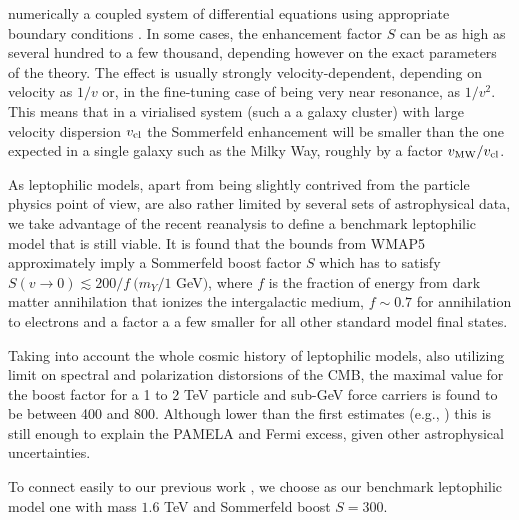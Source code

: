 \documentclass[10pt,aps,pra,reprint,amsmath,amsfonts,amssymb,showpacs]{revtex4-1}
\begin{document}
numerically a coupled system of differential equations using
appropriate boundary conditions
\cite{2005PhRvD..71f3528H,2007NuPhB.787..152C,2009PhRvD..79a5014A}. In
some cases, the enhancement factor $S$ can be as high as several
hundred to a few thousand, depending however on the exact parameters of
the theory. The effect is usually strongly velocity-dependent,
depending on velocity as $1/v$ or, in the fine-tuning case of being
very near resonance, as $1/v^2$. This means that in a virialised
system (such a a galaxy cluster) with large velocity dispersion
$v_{\rm cl}$ the Sommerfeld enhancement will be smaller than the one
expected in a single galaxy such as the Milky Way, roughly by a factor
$v_{\rm MW}/v_{\rm cl}$.


As leptophilic models, apart from being slightly contrived from the
particle physics point of view, are also rather limited by several
sets of astrophysical data, we take advantage of the recent reanalysis
\cite{Finkbeiner:2010sm} to define a benchmark leptophilic model that
is still viable.  It is found that the bounds from WMAP5 approximately
imply a Sommerfeld boost factor $S$ which has to satisfy $S(v\to
0)\lesssim 200/f\ (m_Y/1$ GeV$)$, where $f$ is the fraction of energy
from dark matter annihilation that ionizes the intergalactic medium,
$f\sim 0.7$ for annihilation to electrons and a factor a a few smaller
for all other standard model final states.

Taking into account the whole cosmic history of leptophilic models,
also utilizing limit on spectral and polarization distorsions of the
CMB, the maximal value for the boost factor for a 1 to 2 TeV particle
and sub-GeV force carriers is found to be \cite{Finkbeiner:2010sm}
between 400 and 800. Although lower than the first estimates (e.g.,
\cite{Bergstrom:2009fa,Meade:2009iu}) this is still enough to explain
the PAMELA and Fermi excess, given other astrophysical uncertainties.

To connect easily to our previous work \cite{2009PhRvL.103r1302P}, we
choose as our benchmark leptophilic model one with mass $1.6$ TeV and
Sommerfeld boost $S=300$.
\end{document}
